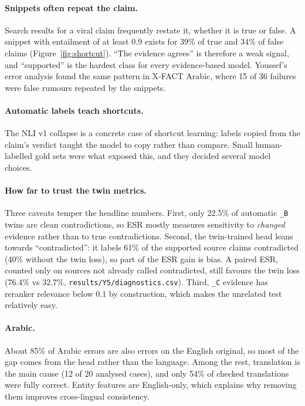 \documentclass[11pt,a4paper]{article}
\newcommand{\tw}[1]{\texttt{\_#1}}          %
\begin{document}
\paragraph{Snippets often repeat the claim.}
Search results for a viral claim frequently restate it, whether it is true or false. A snippet with entailment of at least 0.9 exists for 39\% of true and 34\% of false claims (Figure~\ref{fig:shortcut}). ``The evidence agrees'' is therefore a weak signal, and ``supported'' is the hardest class for every evidence-based model. Youssef's error analysis found the same pattern in X-FACT Arabic, where 15 of 36 failures were false rumours repeated by the snippets.

\paragraph{Automatic labels teach shortcuts.}
The NLI v1 collapse is a concrete case of shortcut learning: labels copied from the claim's verdict taught the model to copy rather than compare. Small human-labelled gold sets were what exposed this, and they decided several model choices.

\paragraph{How far to trust the twin metrics.}
Three caveats temper the headline numbers. First, only 22.5\% of automatic \tw{B} twins are clean contradictions, so ESR mostly measures sensitivity to \emph{changed} evidence rather than to true contradictions. Second, the twin-trained head leans towards ``contradicted'': it labels 61\% of the supported source claims contradicted (40\% without the twin loss), so part of the ESR gain is bias. A paired ESR, counted only on sources not already called contradicted, still favours the twin loss (76.4\% vs 32.7\%, \texttt{results/Y5/diagnostics.csv}). Third, \tw{C} evidence has reranker relevance below 0.1 by construction, which makes the unrelated test relatively easy.

\paragraph{Arabic.}
About 85\% of Arabic errors are also errors on the English original, so most of the gap comes from the head rather than the language. Among the rest, translation is the main cause (12 of 20 analysed cases), and only 54\% of checked translations were fully correct. Entity features are English-only, which explains why removing them improves cross-lingual consistency.
\end{document}
